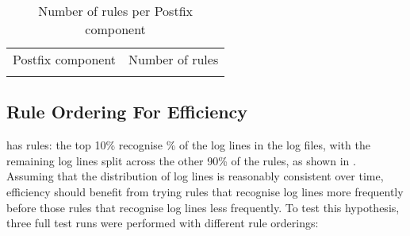 


\begin{table}[thbp]
    \caption{Number of rules per Postfix component}
    \empty{}\label{Number of rules per Postfix component}
    \centering{}
    \begin{tabular}{lr}
        \tabletopline{}%
        Postfix component & Number of rules \\
        \tablemiddleline{}%
        
        \tablebottomline{}%
    \end{tabular}
\end{table}

\FloatBarrier{}

\subsection{Rule Ordering For Efficiency}

\label{rule ordering for efficiency}

\parsername{} has \numberOFrules{} rules: the top 10\% recognise
\% of the log lines in the
\numberOFlogFILES{} log files, with the remaining log lines split across
the other 90\% of the rules, as shown in .
Assuming that the distribution of log lines is reasonably consistent over
time, \parsernames{} efficiency should benefit from trying rules that
recognise log lines more frequently before those rules that recognise log
lines less frequently.  To test this hypothesis, three full test runs were
performed with different rule orderings:

